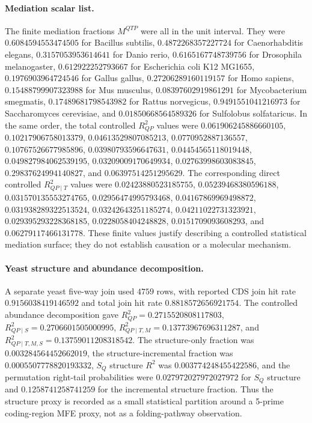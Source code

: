 \paragraph{Mediation scalar list.}
The finite mediation fractions $M^{QTP}$ were all in the unit interval. They were $0.6084594553474505$ for Bacillus subtilis, $0.4872268357227724$ for Caenorhabditis elegans, $0.3157053953614641$ for Danio rerio, $0.6165167748739756$ for Drosophila melanogaster, $0.612922252793667$ for Escherichia coli K12 MG1655, $0.1976903964724546$ for Gallus gallus, $0.27206289160119157$ for Homo sapiens, $0.15488799907323988$ for Mus musculus, $0.08397602919861291$ for Mycobacterium smegmatis, $0.17489681798543982$ for Rattus norvegicus, $0.9491551041216973$ for Saccharomyces cerevisiae, and $0.01850668564589326$ for Sulfolobus solfataricus. In the same order, the total controlled $R^2_{QP}$ values were $0.061906245886660105$, $0.10217906758013379$, $0.04613529807085213$, $0.0770952887136557$, $0.10767526677985896$, $0.03980793596647631$, $0.04454565118019448$, $0.049827984062539195$, $0.03209009170649934$, $0.02763998603083845$, $0.29837624994140827$, and $0.06397514251295629$. The corresponding direct controlled $R^2_{QP\mid T}$ values were $0.02423880523185755$, $0.05239468380596188$, $0.031570135553274765$, $0.02956474995793468$, $0.04167869969498872$, $0.031938289322513524$, $0.03242643251185274$, $0.04211022731323921$, $0.029395293228368185$, $0.0228058404248828$, $0.0151709093608293$, and $0.06279117466131778$. These finite values justify describing a controlled statistical mediation surface; they do not establish causation or a molecular mechanism.

\paragraph{Yeast structure and abundance decomposition.}
A separate yeast five-way join used $4759$ rows, with reported CDS join hit rate $0.9156038419146592$ and total join hit rate $0.8818572656921754$. The controlled abundance decomposition gave $R^2_{QP}=0.2715520808117803$, $R^2_{QP\mid S}=0.2706601505000995$, $R^2_{QP\mid T,M}=0.13773967696311287$, and $R^2_{QP\mid T,M,S}=0.13759011208318542$. The structure-only fraction was $0.003284564452662019$, the structure-incremental fraction was $0.0005507778820193332$, $S_Q$ structure $R^2$ was $0.003774248455422586$, and the permutation right-tail probabilities were $0.027972027972027972$ for $S_Q$ structure and $0.1258741258741259$ for the incremental structure fraction. Thus the structure proxy is recorded as a small statistical partition around a 5-prime coding-region MFE proxy, not as a folding-pathway observation.

